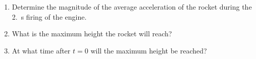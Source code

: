 \documentclass{../../../oss-apphys}
\begin{document}
\begin{enumerate}[leftmargin=15pt]
\begin{enumerate}[leftmargin=18pt,topsep=0pt,noitemsep]
\begin{multicols}{3}
      \columnbreak
      
      \columnbreak
      
    \end{multicols}
    \vspace{.3in}
  \item Determine the magnitude of the average acceleration of the rocket during
    the \SI{2.}{\second} firing of the engine.
  \item What is the maximum height the rocket will reach?
  \item At what time after $t=0$ will the maximum height be reached?
  \end{enumerate}
  \newpage
  
  

\end{enumerate}
\end{document}

